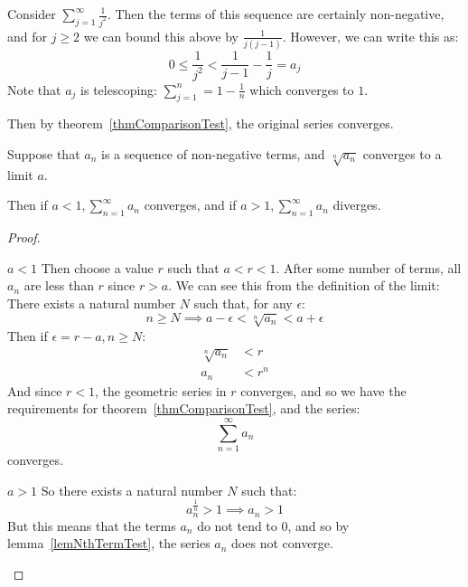 \documentclass[../Main.tex]{subfiles}
\begin{document}
\begin{example}
    Consider $\sum_{j=1}^\infty \frac{1}{j^2}$. Then the terms of this sequence are certainly non-negative, and for $j \geq 2$ we can bound this above by $\frac{1}{j(j-1)}$. However, we can write this as:
    \begin{equation*}
        0 \leq \frac{1}{j^2} < \frac{1}{j-1} - \frac{1}{j} = a_j
    \end{equation*}
    Note that $a_j$ is telescoping: $\sum_{j=1}^n = 1 - \frac{1}{n}$ which converges to $1$.\par
    Then by theorem~\ref{thmComparisonTest}, the original series converges.
\end{example}
\begin{theorem}
    Suppose that $a_n$ is a sequence of non-negative terms, and $\sqrt[n]{a_n}$ converges to a limit $a$.\par
    Then if $a < 1, \sum_{n=1}^{\infty} a_n$ converges, and if $a > 1, \sum_{n=1}^{\infty} a_n$ diverges.
    \label{thmRootTest}
\end{theorem}
\begin{proof}
    \begin{case}{$a < 1$}
        Then choose a value $r$ such that $a < r < 1$. After some number of terms, all $a_n$ are less than $r$ since $r > a$. We can see this from the definition of the limit:
        There exists a natural number $N$ such that, for any $\epsilon$:
        \begin{equation*}
            n \geq N \implies a - \epsilon < \sqrt[n]{a_n} < a + \epsilon
        \end{equation*}
        Then if $\epsilon = r - a, n \geq N$:
        \begin{align*}
            \sqrt[n]{a_n} &< r \\
            a_n &< r^n
        \end{align*}
        And since $r < 1$, the geometric series in $r$ converges, and so we have the requirements for theorem~\ref{thmComparisonTest}, and the series:
        \begin{equation*}
            \sum_{n=1}^\infty a_n
        \end{equation*}
        converges.
    \end{case}
    \begin{case}{$a > 1$}
        So there exists a natural number $N$ such that:
        \begin{equation*}
            a_n^{\frac{1}{n}} > 1 \implies a_n > 1
        \end{equation*}
        But this means that the terms $a_n$ do not tend to 0, and so by lemma~\ref{lemNthTermTest}, the series $a_n$ does not converge.
    \end{case}
\end{proof}
\end{document}
